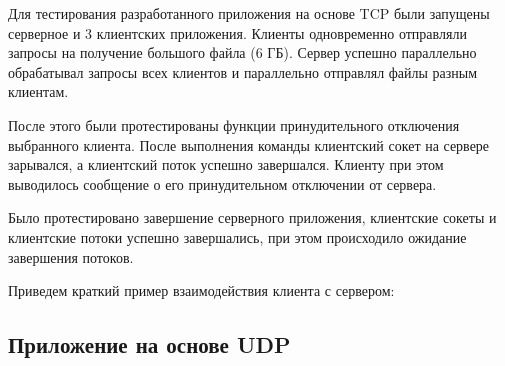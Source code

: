 Для тестирования разработанного приложения на основе TCP были запущены серверное и 3 клиентских приложения. Клиенты одновременно отправляли запросы на получение большого файла (6 ГБ). Сервер успешно параллельно обрабатывал запросы всех клиентов и параллельно отправлял файлы разным клиентам. 

После этого были протестированы функции принудительного отключения выбранного клиента. После выполнения команды  клиентский сокет на сервере зарывался, а клиентский поток успешно завершался. Клиенту при этом выводилось сообщение о его принудительном отключении от сервера.

Было протестировано завершение серверного приложения, клиентские сокеты и клиентские потоки успешно завершались, при этом происходило ожидание завершения потоков.

Приведем краткий пример взаимодействия клиента с сервером:




\subsection{Приложение на основе UDP}

